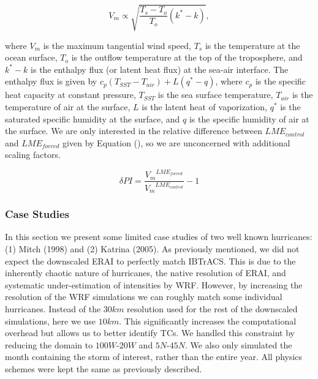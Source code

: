 \documentclass[phd,tocprelim]{cornell}
\begin{document}
\begin{equation}
{V_m} \propto \sqrt{\frac{T_s-T_{o}}{T_{o}}(k^{*}-k)},
\label{PI:eqn}
\end{equation}

where  $V_m$ is the maximum tangential wind speed, $T_s$
is the temperature at the ocean surface, $T_o$ is the outflow
temperature at the top of the troposphere, and $k^{*}-k$ is the
enthalpy flux (or latent heat flux) at the sea-air interface. The
enthalpy flux is given by $c_p(T_{SST}-T_{air})+L(q^{*}-q)$, where
$c_p$ is the specific heat capacity at constant pressure, $T_{SST}$ is
the sea surface temperature, $T_{air}$ is the temperature of air at
the surface, $L$ is the latent heat of vaporization, $q^{*}$ is the
saturated specific humidity at the surface, and $q$ is the specific
humidity of air at the surface. We are only interested in the relative
difference between $LME_{control}$ and $LME_{forced}$ given by
Equation (), so we are unconcerned with additional scaling
factors.

\begin{equation}
\delta PI = \frac{{V_{m}}^{LME_{forced}}}{{V_{m}}^{LME_{control}}}-1
\label{dpi}
\end{equation}

\subsubsection{Case Studies}\label{cases}

In this section we present some limited case studies of two well 
known hurricanes: (1) Mitch (1998) and (2) Katrina (2005). As previously 
mentioned, we did not expect the downscaled ERAI to perfectly match 
IBTrACS. This is due to the inherently chaotic nature of hurricanes, 
the native resolution of ERAI, and systematic under-estimation of 
intensities by WRF. However, by increasing the resolution of the WRF 
simulations we can roughly match some individual hurricanes. Instead 
of the $30 km$ resolution used for the rest of the downscaled 
simulations, here we use $10 km$. This significantly increases the 
computational overhead but allows us to better identify TCs. We handled 
this constraint by reducing the domain to $100 W$-$20 W$ and $5 N$-$45 N$. 
We also only simulated the month containing the storm of interest, rather 
than the entire year. All physics schemes were kept the same as previously 
described. 
\end{document}
